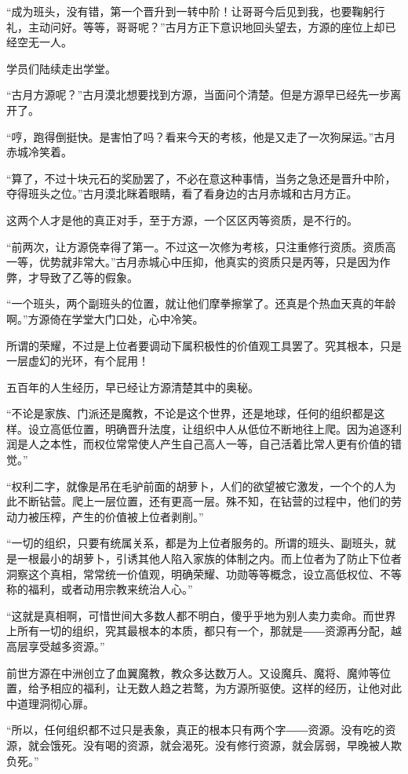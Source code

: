 \begin{this_body}
“成为班头，没有错，第一个晋升到一转中阶！让哥哥今后见到我，也要鞠躬行礼，主动问好。等等，哥哥呢？”古月方正下意识地回头望去，方源的座位上却已经空无一人。

学员们陆续走出学堂。

“古月方源呢？”古月漠北想要找到方源，当面问个清楚。但是方源早已经先一步离开了。

“哼，跑得倒挺快。是害怕了吗？看来今天的考核，他是又走了一次狗屎运。”古月赤城冷笑着。

“算了，不过十块元石的奖励罢了，不必在意这种事情，当务之急还是晋升中阶，夺得班头之位。”古月漠北眯着眼睛，看了看身边的古月赤城和古月方正。

这两个人才是他的真正对手，至于方源，一个区区丙等资质，是不行的。

“前两次，让方源侥幸得了第一。不过这一次修为考核，只注重修行资质。资质高一等，优势就非常大。”古月赤城心中压抑，他真实的资质只是丙等，只是因为作弊，才导致了乙等的假象。

“一个班头，两个副班头的位置，就让他们摩拳擦掌了。还真是个热血天真的年龄啊。”方源倚在学堂大门口处，心中冷笑。

所谓的荣耀，不过是上位者要调动下属积极性的价值观工具罢了。究其根本，只是一层虚幻的光环，有个屁用！

五百年的人生经历，早已经让方源清楚其中的奥秘。

“不论是家族、门派还是魔教，不论是这个世界，还是地球，任何的组织都是这样。设立高低位置，明确晋升法度，让组织中人从低位不断地往上爬。因为追逐利润是人之本性，而权位常常使人产生自己高人一等，自己活着比常人更有价值的错觉。”

“权利二字，就像是吊在毛驴前面的胡萝卜，人们的欲望被它激发，一个个的人为此不断钻营。爬上一层位置，还有更高一层。殊不知，在钻营的过程中，他们的劳动力被压榨，产生的价值被上位者剥削。”

“一切的组织，只要有统属关系，都是为上位者服务的。所谓的班头、副班头，就是一根最小的胡萝卜，引诱其他人陷入家族的体制之内。而上位者为了防止下位者洞察这个真相，常常统一价值观，明确荣耀、功勋等等概念，设立高低权位、不等称的福利，或者动用宗教来统治人心。”

“这就是真相啊，可惜世间大多数人都不明白，傻乎乎地为别人卖力卖命。而世界上所有一切的组织，究其最根本的本质，都只有一个，那就是――资源再分配，越高层享受越多资源。”

前世方源在中洲创立了血翼魔教，教众多达数万人。又设魔兵、魔将、魔帅等位置，给予相应的福利，让无数人趋之若鹜，为方源所驱使。这样的经历，让他对此中道理洞彻心扉。

“所以，任何组织都不过只是表象，真正的根本只有两个字――资源。没有吃的资源，就会饿死。没有喝的资源，就会渴死。没有修行资源，就会孱弱，早晚被人欺负死。”


\end{this_body}
